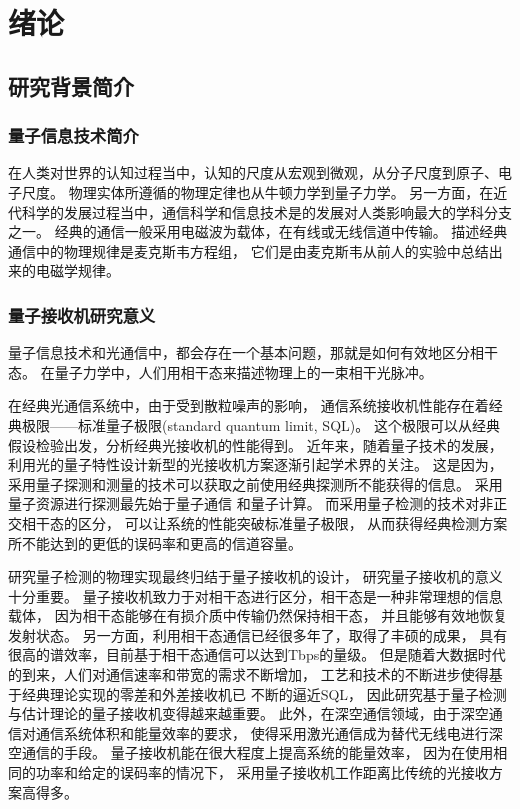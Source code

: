 \chapter{绪论}
\section{研究背景简介}

\subsection{量子信息技术简介}
在人类对世界的认知过程当中，认知的尺度从宏观到微观，从分子尺度到原子、电子尺度。
物理实体所遵循的物理定律也从牛顿力学到量子力学。
另一方面，在近代科学的发展过程当中，通信科学和信息技术是的发展对人类影响最大的学科分支之一。
经典的通信一般采用电磁波为载体，在有线或无线信道中传输。
描述经典通信中的物理规律是麦克斯韦方程组，
它们是由麦克斯韦从前人的实验中总结出来的电磁学规律。

\subsection{量子接收机研究意义}
量子信息技术和光通信中，都会存在一个基本问题，那就是如何有效地区分相干态。
在量子力学中，人们用相干态来描述物理上的一束相干光脉冲。

在经典光通信系统中，由于受到散粒噪声的影响，
通信系统接收机性能存在着经典极限——标准量子极限(standard quantum limit, SQL)。
这个极限可以从经典假设检验出发，分析经典光接收机的性能得到\cite{helstrom1976quantum}。
近年来，随着量子技术的发展，利用光的量子特性设计新型的光接收机方案逐渐引起学术界的关注。
这是因为，采用量子探测和测量的技术可以获取之前使用经典探测所不能获得的信息。
采用量子资源进行探测最先始于量子通信\cite{gisin2007quantum}
和量子计算\cite{ladd2010quantum}。
而采用量子检测的技术对非正交相干态的区分，
可以让系统的性能突破标准量子极限，
从而获得经典检测方案所不能达到的更低的误码率\cite{helstrom1976quantum}和更高的信道容量\cite{hausladen1996classical}。

研究量子检测的物理实现最终归结于量子接收机的设计，
研究量子接收机的意义十分重要。
量子接收机致力于对相干态进行区分，相干态是一种非常理想的信息载体，
因为相干态能够在有损介质中传输仍然保持相干态，
并且能够有效地恢复发射状态。
另一方面，利用相干态通信已经很多年了，取得了丰硕的成果，
具有很高的谱效率，目前基于相干态通信可以达到Tbps的量级\cite{jinno2007networks}。
但是随着大数据时代的到来，人们对通信速率和带宽的需求不断增加，
工艺和技术的不断进步使得基于经典理论实现的零差和外差接收机已
不断的逼近SQL\cite{tsukamoto2006unrepeated}，
因此研究基于量子检测与估计理论的量子接收机变得越来越重要。
此外，在深空通信领域，由于深空通信对通信系统体积和能量效率的要求，
使得采用激光通信成为替代无线电进行深空通信的手段\cite{hemmati2006deep}。
量子接收机能在很大程度上提高系统的能量效率，
因为在使用相同的功率和给定的误码率的情况下，
采用量子接收机工作距离比传统的光接收方案高得多\cite{helstrom1976quantum}。



